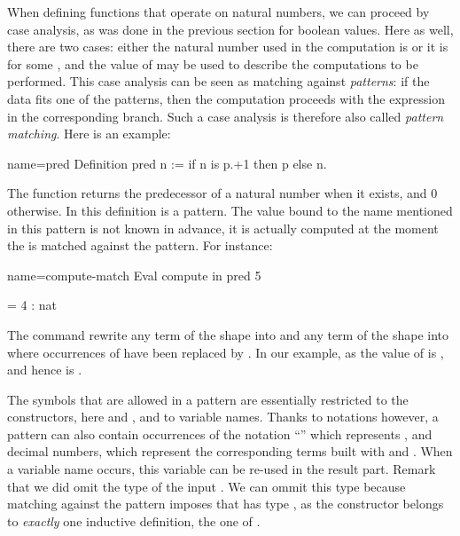 When defining functions that operate on natural numbers, we can
proceed by case analysis, as was done in the previous section for boolean
values. Here as well, there are two cases: either the natural number used in
the computation is  or it is  for
some , and the value of  may be used to describe the
computations to be performed. This case analysis can be seen as
matching against \emph{patterns}: if the data fits one of
the patterns, then the computation proceeds with the expression in the
corresponding branch.  Such a case analysis is therefore also called
\emph{pattern matching}. Here is an example:

\begin{coq}{name=pred}{}
Definition pred n := if n is p.+1 then p else n.
\end{coq}

The function  returns the predecessor of a natural number
when it exists, and 0 otherwise. In this definition  is a
pattern. The value bound to the name  mentioned in this pattern is not
known in advance, it is actually computed at the moment the  is matched
against the pattern. For instance:

\begin{coq}{name=compute-match}{}
Eval compute in pred 5
\end{coq}
\begin{coqout}{}{}
= 4 : nat
\end{coqout}

The  command rewrite any term of the shape
 into  and any term of the shape
 into  where occurrences of
 have been replaced by . In our example, as the value of
 is ,  and hence  is .


The symbols that are allowed in a pattern are essentially restricted
to the constructors, here  and , and to variable names.
Thanks to notations however, a pattern can also contain
occurrences of the notation ``'' which represents , and
decimal numbers, which represent the corresponding terms built with
 and .  When a variable name occurs, this variable can be
re-used in the result part.
Remark that we did omit the type of the input . We can ommit this
type because matching
 against  the  pattern imposes that  has type
, as the  constructor belongs to \emph{exactly}
one inductive definition, the one of .

